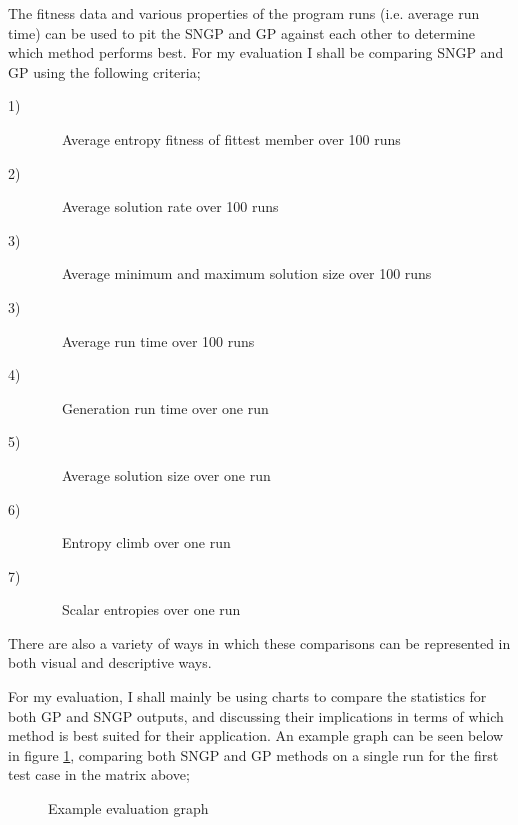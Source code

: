 \documentclass[a4paper,10.5pt]{article}
\begin{document}
The fitness data and various properties of the program runs (i.e. average run time) can be used to pit the SNGP and GP against each other to determine which method performs best. For my evaluation I shall be comparing SNGP and GP using the following criteria;

\begin{description}
  \item[1)]
  \ \ Average entropy fitness of fittest member over 100 runs
  \item[2)]
 \ \ Average solution rate over 100 runs
  \item[3)]
 \ \  Average minimum and maximum solution size over 100 runs
  \item[3)]
  \ \ Average run time over 100 runs
  \item[4)]
  \ \ Generation run time over one run
  \item[5)]
  \ \  Average solution size over one run
  \item[6)]
  \ \  Entropy climb over one run
  \item[7)]
  \ \  Scalar entropies over one run
\end{description}

There are also a variety of ways in which these comparisons can be represented in both visual and descriptive ways.

For my evaluation, I shall mainly be using charts to compare the statistics for both GP and SNGP outputs, and discussing their implications in terms of which method is best suited for their application. An example graph can be seen below in figure \ref{examplegraph}, comparing both SNGP and GP methods on a single run for the first test case in the matrix above;

\begin{figure}[H]
\caption{Example evaluation graph}
\label{examplegraph}
\end{figure}
\end{document}
